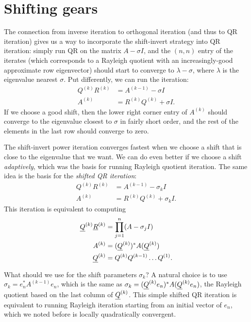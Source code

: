 \section{Shifting gears}

The connection from inverse iteration to orthogonal iteration (and
thus to QR iteration) gives us a way to incorporate the shift-invert
strategy into QR iteration: simply run QR on the matrix $A-\sigma I$,
and the $(n,n)$ entry of the iterates (which corresponds to a Rayleigh
quotient with an increasingly-good approximate row eigenvector) should
start to converge to $\lambda - \sigma$, where $\lambda$ is the
eigenvalue nearest $\sigma$.  Put differently, we can run the
iteration:
\begin{align*}
  Q^{(k)} R^{(k)} &= A^{(k-1)} - \sigma I \\
  A^{(k)} &= R^{(k)} Q^{(k)} + \sigma I.
\end{align*}
If we choose a good shift, then the lower right corner entry of
$A^{(k)}$ should converge to the eigenvalue closest to $\sigma$ in
fairly short order, and the rest of the elements in the last row
should converge to zero.

The shift-invert power iteration converges fastest when we choose a
shift that is close to the eigenvalue that we want.  We can do even
better if we choose a shift {\em adaptively}, which was the basis for
running Rayleigh quotient iteration.  The same idea is the basis
for the {\em shifted QR iteration}:
\begin{align}
  Q^{(k)} R^{(k)} &= A^{(k-1)} - \sigma_k I \label{sqr-1} \\
  A^{(k)} &= R^{(k)} Q^{(k)} + \sigma_k I. \label{sqr-2}
\end{align}
This iteration is equivalent to computing
\begin{align*}
  \underline{Q}^{(k)} \underline{R}^{(k)} &= \prod_{j=1}^n (A-\sigma_j I) \\
  A^{(k)} &= (\underline{Q}^{(k)})^* A (\underline{Q}^{(k)}) \\
  \underline{Q}^{(k)} &= Q^{(k)} Q^{(k-1)} \ldots Q^{(1)}.
\end{align*}

What should we use for the shift parameters $\sigma_k$?  A natural
choice is to use $\sigma_k = e_n^* A^{(k-1)} e_n$, which is the same
as $\sigma_k = (\underline{Q}^{(k)} e_n)^* A (\underline{Q}^{(k)} e_n)$, the Rayleigh quotient
based on the last column of $\underline{Q}^{(k)}$.  This simple shifted QR iteration
is equivalent to running Rayleigh iteration starting from an initial vector
of $e_n$, which we noted before is locally quadratically convergent.
